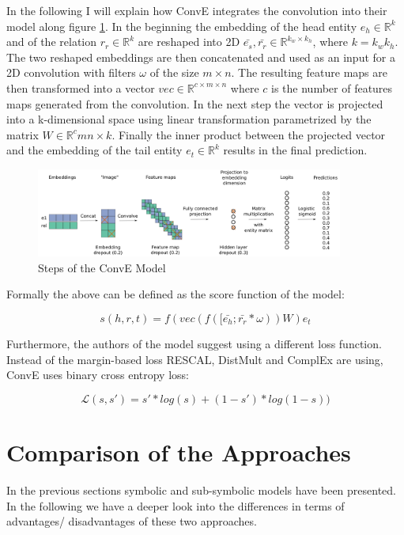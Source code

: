 In the following I will explain how ConvE integrates the convolution into their model along figure \ref{fig:conve}. In the beginning the embedding of the head entity $e_h \in \mathbb{R}^k$ and of the relation $r_r \in \mathbb{R}^k$ are reshaped into 2D $\bar{e_s},\bar{r_r} \in \mathbb{R}^{k_w \times k_h}$, where $k=k_wk_h$.
The two reshaped embeddings are then concatenated and used as an input for a 2D convolution with filters $\omega$ of the size $m \times n$.
The resulting feature maps are then transformed into a vector $vec \in \mathbb{R}^{c \times m \times n}$ where $c$ is the number of features maps generated from the convolution. 
In the next step the vector is projected into a k-dimensional space using linear transformation parametrized by the matrix $W \in \mathbb{R}^cmn \times k$. Finally the inner product between the projected vector and the embedding of the tail entity $e_t \in \mathbb{R}^k$ results in the final prediction. \cite{dettmers_convolutional_2018}

\begin{figure}[H]
\centering
\includegraphics[width=0.9\textwidth]{images/conve.png}
\caption{Steps of the ConvE Model}
\label{fig:conve}
\end{figure}

Formally the above can be defined as the score function of the model:

\begin{equation}
s(h,r,t)=f(vec(f([\bar{e_h};\bar{r_r} * \omega))W)e_t
\end{equation}

Furthermore, the authors of the model suggest using a different loss function. Instead of the margin-based loss RESCAL, DistMult and ComplEx are using, ConvE uses binary cross entropy loss: 

\begin{equation}
\mathcal{L}(s,s') = s'*log(s)+(1-s')*log(1-s))
\end{equation}

\section{Comparison of the Approaches}
\label{cha:compare_approaches}
In the previous sections symbolic and sub-symbolic models have been presented. In the following we have a deeper look into the differences in terms of advantages/ disadvantages of these two approaches.


